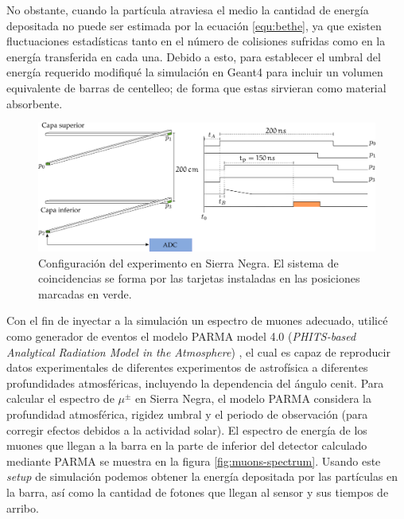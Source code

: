 No obstante, cuando la partícula atraviesa el medio la cantidad de energía depositada no puede ser estimada por la ecuación \ref{equ:bethe}, ya que existen fluctuaciones estadísticas tanto en el número de colisiones sufridas como en la energía transferida en cada una. Debido a esto, para establecer el umbral del energía requerido modifiqué la simulación en Geant4 para incluir un volumen equivalente de barras de centelleo; de forma que estas sirvieran como material absorbente.

\begin{figure}
        \centering
        \includegraphics[width=\textwidth]{muons-experiment.pdf}
        \caption{Configuración del experimento en Sierra Negra. El sistema de coincidencias se forma por las tarjetas instaladas en las posiciones marcadas en verde.}
        \label{fig:muons-experiment}
\end{figure}

Con el fin de inyectar a la simulación un espectro de muones adecuado, utilicé como generador de eventos el modelo PARMA model 4.0 (\emph{PHITS-based Analytical Radiation Model in the Atmosphere}) \cite{sato15}, el cual es capaz de reproducir datos experimentales de diferentes experimentos de astrofísica a diferentes profundidades atmosféricas, incluyendo la dependencia del ángulo cenit. Para calcular el espectro de $\mu^{\pm}$ en Sierra Negra, el modelo PARMA considera la profundidad atmosférica, rigidez umbral y el periodo de observación (para corregir efectos debidos a la actividad solar). El espectro de energía de los muones que llegan a la barra en la parte de inferior del detector calculado mediante PARMA se muestra en la figura \ref{fig:muons-spectrum}. Usando este \emph{setup} de simulación podemos obtener la energía depositada por las partículas en la barra, así como la cantidad de fotones que llegan al sensor y sus tiempos de arribo.

